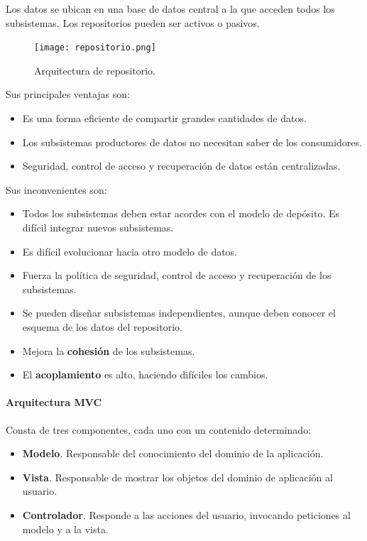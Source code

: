 \documentclass[12pt,spanish]{article}
\begin{document}
Los datos se ubican en una base de datos central a la que acceden todos los subsistemas. Los repositorios pueden ser activos o pasivos.

\begin{figure}[H]
\centering
\texttt{[image: repositorio.png]}
\caption{Arquitectura de repositorio.}
\end{figure}

Sus principales ventajas son:

\begin{itemize}
	\item Es una forma eficiente de compartir grandes cantidades de datos.
	\item Los subsistemas productores de datos no necesitan saber de los consumidores.
	\item Seguridad, control de acceso y recuperación de datos están centralizadas.
\end{itemize}

Sus inconvenientes son:

\begin{itemize}
	\item Todos los subsistemas deben estar acordes con el modelo de depósito. Es difícil integrar nuevos subsistemas.
	\item Es difícil evolucionar hacia otro modelo de datos.
	\item Fuerza la política de seguridad, control de acceso y recuperación de los subsistemas.
\end{itemize}

\begin{itemize}
	\item Se pueden diseñar subsistemas independientes, aunque deben conocer el esquema de los datos del repositorio.
	\item Mejora la \textbf{cohesión} de los subsistemas.
	\item El \textbf{acoplamiento} es alto, haciendo difíciles los cambios.
\end{itemize}

\newpage

\paragraph{Arquitectura MVC\\}

Consta de tres componentes, cada uno con un contenido determinado:

\begin{itemize}
	\item \textbf{Modelo}. Responsable del conocimiento del dominio de la aplicación.
	\item \textbf{Vista}. Responsable de mostrar los objetos del dominio de aplicación al usuario.
	\item \textbf{Controlador}. Responde a las acciones del usuario, invocando peticiones al modelo y a la vista.
\end{itemize}
\end{document}
